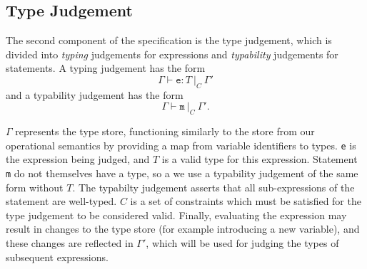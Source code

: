 \documentclass[12pt,a4paper,twoside,openright]{report}
\theoremstyle{definition}
\theoremstyle{dotless}
\newcommand*{\js}{\texttt}
\begin{document}
%
%

\subsection{Type Judgement} The second component of the specification is the
type judgement, which is divided into \textit{typing} judgements for
expressions and \textit{typability} judgements for statements. A typing
judgement has the form $$\Gamma\vdash \mathtt{e} : T\ |_C\ \Gamma'$$ and a typability
judgement has the form $$\Gamma \vdash \mathtt{m}\ |_C\ \Gamma'.$$

$\Gamma$ represents the type store, functioning similarly to the store from our
operational semantics by providing a map from variable identifiers to types.
\js{e} is the expression being judged, and $T$ is a valid type for this
expression. Statement \js{m} do not themselves have a type, so a we use a
typability judgement of the same form without $T$. The typabilty judgement
asserts that all sub-expressions of the statement are well-typed. $C$ is a set
of constraints which must be satisfied for the type judgement to be considered
valid. Finally, evaluating the expression may result in changes to the type store (for
example introducing a new variable), and these changes are reflected in
$\Gamma'$, which will be used for judging the types of subsequent expressions.
\end{document}
